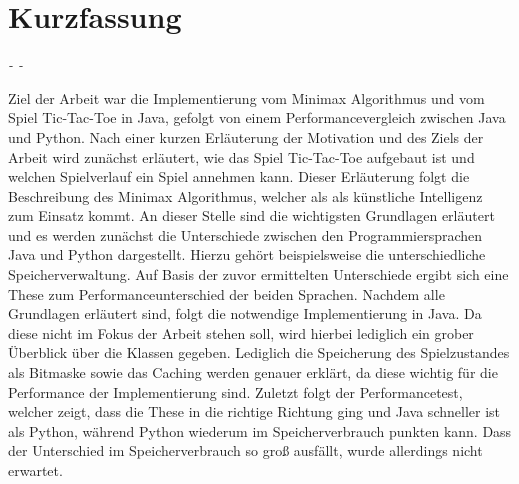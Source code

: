 \chapter*{Kurzfassung}

\begin{flushright}
    \textit{\DerAutorDerArbeit - \DieMatrikelnummer - \DieKursbezeichnung}
\end{flushright}

\textbf{\DerTitelDerArbeit}

Ziel der Arbeit war die Implementierung vom Minimax Algorithmus und vom Spiel Tic-Tac-Toe in Java,
gefolgt von einem Performancevergleich zwischen Java und Python. Nach einer kurzen Erläuterung
der Motivation und des Ziels der Arbeit wird zunächst erläutert, wie das Spiel Tic-Tac-Toe
aufgebaut ist und welchen Spielverlauf ein Spiel annehmen kann. Dieser Erläuterung folgt die
Beschreibung des Minimax Algorithmus, welcher als als künstliche Intelligenz zum Einsatz kommt.
An dieser Stelle sind die wichtigsten Grundlagen erläutert und es werden zunächst die
Unterschiede zwischen den Programmiersprachen Java und Python dargestellt. Hierzu gehört
beispielsweise die unterschiedliche Speicherverwaltung. Auf Basis der zuvor ermittelten Unterschiede
ergibt sich eine These zum Performanceunterschied der beiden Sprachen. Nachdem alle Grundlagen 
erläutert sind, folgt die notwendige Implementierung in Java. Da diese nicht im Fokus der Arbeit 
stehen soll, wird hierbei lediglich ein grober Überblick über die Klassen gegeben. Lediglich die
Speicherung des Spielzustandes als Bitmaske sowie das Caching werden genauer erklärt, da diese wichtig
für die Performance der Implementierung sind. Zuletzt folgt der Performancetest, welcher zeigt, dass 
die These in die richtige Richtung ging und Java schneller ist als Python, während Python
wiederum im Speicherverbrauch punkten kann. Dass der Unterschied im Speicherverbrauch so groß ausfällt,
wurde allerdings nicht erwartet.